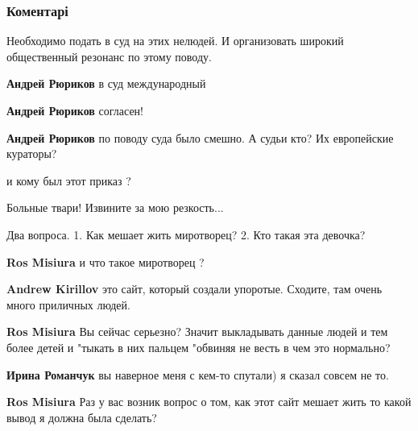  
 
 
 
 
\subsubsection{Коментарі}
\label{sec:13_10_2021.fb.zharkih_denis.2.savenkova_mirotvorec.cmt}

\begin{itemize} %
Необходимо подать в суд на этих нелюдей. И организовать широкий общественный резонанс по этому поводу.

\begin{itemize} %
\textbf{Андрей Рюриков} в суд международный

\textbf{Андрей Рюриков} согласен!

\textbf{Андрей Рюриков} по поводу суда было смешно. А судьи кто? Их европейские кураторы?

и кому был этот приказ ?
\end{itemize} %

Больные твари!
Извините за мою резкость...

Два вопроса.
1. Как мешает жить миротворец?
2. Кто такая эта девочка?

\begin{itemize} %
\textbf{Ros Misiura} и что такое миротворец ?

\textbf{Andrew Kirillov} это сайт, который создали упоротые. Сходите, там очень много приличных людей.

\textbf{Ros Misiura} Вы сейчас серьезно? Значит выкладывать данные людей и тем более детей и "тыкать в них пальцем "обвиняя не весть в чем это нормально?

\textbf{Ирина Романчук} вы наверное меня с кем-то спутали) я сказал совсем не то.

\textbf{Ros Misiura} Раз у вас возник вопрос о том, как этот сайт мешает жить то какой вывод я должна была сделать?


\end{itemize}
\end{itemize}
